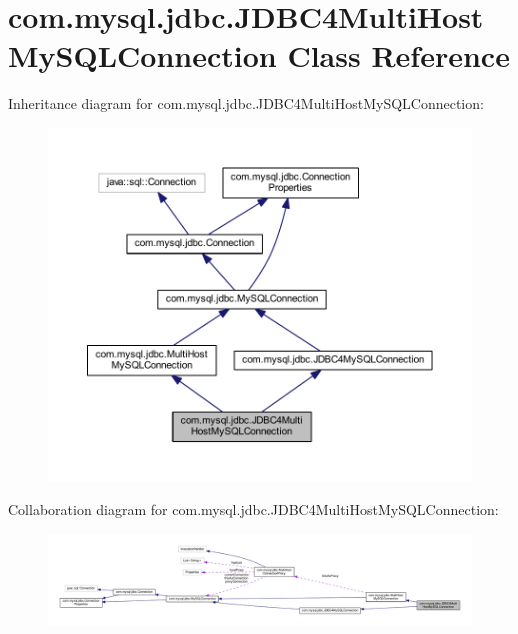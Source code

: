 \hypertarget{classcom_1_1mysql_1_1jdbc_1_1_j_d_b_c4_multi_host_my_s_q_l_connection}{}\section{com.\+mysql.\+jdbc.\+J\+D\+B\+C4\+Multi\+Host\+My\+S\+Q\+L\+Connection Class Reference}
\label{classcom_1_1mysql_1_1jdbc_1_1_j_d_b_c4_multi_host_my_s_q_l_connection}


Inheritance diagram for com.\+mysql.\+jdbc.\+J\+D\+B\+C4\+Multi\+Host\+My\+S\+Q\+L\+Connection\+:
\nopagebreak
\begin{figure}[H]
\begin{center}
\leavevmode
\includegraphics[width=350pt]{classcom_1_1mysql_1_1jdbc_1_1_j_d_b_c4_multi_host_my_s_q_l_connection__inherit__graph}
\end{center}
\end{figure}


Collaboration diagram for com.\+mysql.\+jdbc.\+J\+D\+B\+C4\+Multi\+Host\+My\+S\+Q\+L\+Connection\+:
\nopagebreak
\begin{figure}[H]
\begin{center}
\leavevmode
\includegraphics[width=350pt]{classcom_1_1mysql_1_1jdbc_1_1_j_d_b_c4_multi_host_my_s_q_l_connection__coll__graph}
\end{center}
\end{figure}
